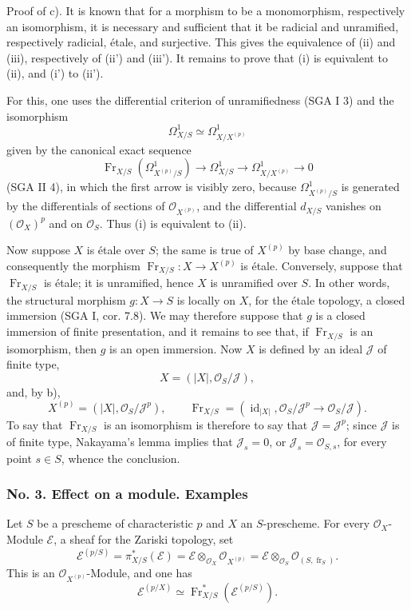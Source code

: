 \documentclass[11pt]{article}
\providecommand{\OO}{\mathcal{O}}
\providecommand{\id}{\operatorname{id}}
\providecommand{\cE}{\mathcal E}
\providecommand{\id}{\operatorname{id}}
\providecommand{\id}{\operatorname{id}}
\providecommand{\id}{\operatorname{id}}
\providecommand{\id}{\operatorname{id}}
\providecommand{\fr}{\operatorname{fr}}
\providecommand{\Fr}{\operatorname{Fr}}
\providecommand{\JJ}{\mathcal J}
\providecommand{\Fr}{\operatorname{Fr}}
\providecommand{\fr}{\operatorname{fr}}
\providecommand{\id}{\operatorname{id}}
\begin{document}
Proof of c). It is known that for a morphism to be a monomorphism, respectively an isomorphism, it is necessary and sufficient that it be radicial and unramified, respectively radicial, étale, and surjective. This gives the equivalence of (ii) and (iii), respectively of (ii') and (iii'). It remains to prove that (i) is equivalent to (ii), and (i') to (ii').

For this, one uses the differential criterion of unramifiedness (SGA I 3) and the isomorphism
\[
\Omega^1_{X/S}\simeq \Omega^1_{X/X^{(p)}}
\]
given by the canonical exact sequence
\[
\Fr_{X/S}(\Omega^1_{X^{(p)}/S})\longrightarrow \Omega^1_{X/S}
\longrightarrow \Omega^1_{X/X^{(p)}}\longrightarrow 0
\]
(SGA II 4), in which the first arrow is visibly zero, because $\Omega^1_{X^{(p)}/S}$ is generated by the differentials of sections of $\OO_{X^{(p)}}$, and the differential $d_{X/S}$ vanishes on $(\OO_X)^p$ and on $\OO_S$. Thus (i) is equivalent to (ii).

Now suppose $X$ is étale over $S$; the same is true of $X^{(p)}$ by base change, and consequently the morphism $\Fr_{X/S}:X\to X^{(p)}$ is étale. Conversely, suppose that $\Fr_{X/S}$ is étale; it is unramified, hence $X$ is unramified over $S$. In other words, the structural morphism $g:X\to S$ is locally on $X$, for the étale topology, a closed immersion (SGA I, cor. 7.8). We may therefore suppose that $g$ is a closed immersion of finite presentation, and it remains to see that, if $\Fr_{X/S}$ is an isomorphism, then $g$ is an open immersion. Now $X$ is defined by an ideal $\JJ$ of finite type,
\[
X=(|X|,\OO_S/\JJ),
\]
and, by b),
\[
X^{(p)}=(|X|,\OO_S/\JJ^p),
\qquad
\Fr_{X/S}=(\id_{|X|},\OO_S/\JJ^p\to\OO_S/\JJ).
\]
To say that $\Fr_{X/S}$ is an isomorphism is therefore to say that $\JJ=\JJ^p$; since $\JJ$ is of finite type, Nakayama's lemma implies that $\JJ_s=0$, or $\JJ_s=\OO_{S,s}$, for every point $s\in S$, whence the conclusion.

\subsubsection*{No. 3. Effect on a module. Examples}

Let $S$ be a prescheme of characteristic $p$ and $X$ an $S$-prescheme. For every $\OO_X$-Module $\cE$, a sheaf for the Zariski topology, set
\[
\cE^{(p/S)}=\pi_{X/S}^*(\cE)=\cE\otimes_{\OO_X}\OO_{X^{(p)}}
 =\cE\otimes_{\OO_S}\OO_{(S,\fr_S)}.
\]
This is an $\OO_{X^{(p)}}$-Module, and one has
\[
\cE^{(p/X)}\simeq \Fr_{X/S}^*(\cE^{(p/S)}).
\]
\end{document}
